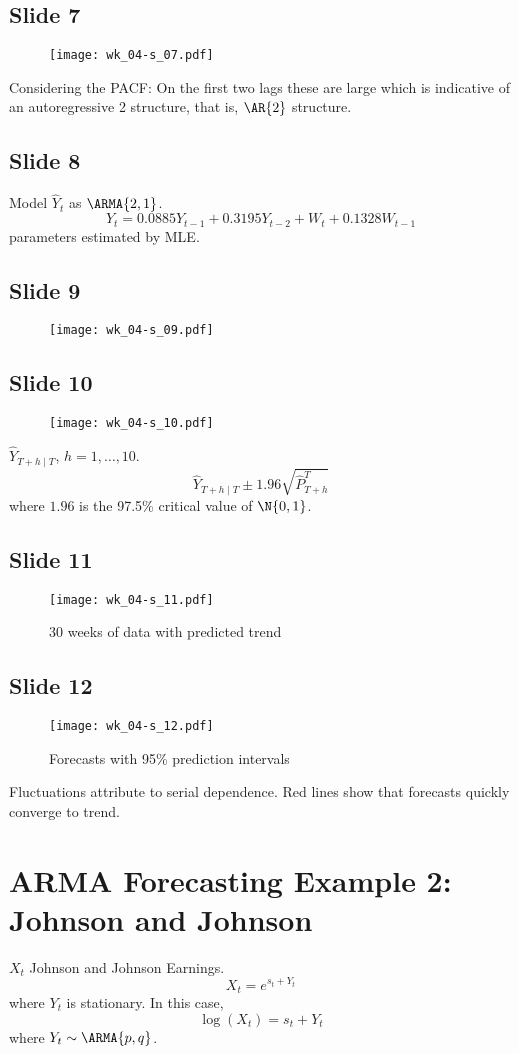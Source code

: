 \subsection*{Slide 7}
\begin{figure}[H]
    \centering
    \texttt{[image: wk\_04-s\_07.pdf]}
\end{figure}
Considering the PACF\@: On the first two lags these are large which
is indicative of an autoregressive 2 structure, that is, $ \AR{2} $
structure.

\subsection*{Slide 8}
Model $ \hat{Y}_{t} $ as $ \ARMA{2,1} $.
\[ Y_t=0.0885 Y_{t-1}+0.3195 Y_{t-2}+W_t +0.1328 W_{t-1} \]
parameters estimated by MLE\@.

\subsection*{Slide 9}
\begin{figure}[H]
    \centering
    \texttt{[image: wk\_04-s\_09.pdf]}
\end{figure}

\subsection*{Slide 10}
\begin{figure}[H]
    \centering
    \texttt{[image: wk\_04-s\_10.pdf]}
\end{figure}
$ \hat{Y}_{T+h\mid T} $, $ h=1,\ldots,10 $.
\[ \hat{Y}_{T+h\mid T}\pm 1.96\sqrt{\hat{P}_{T+h}^T} \]
where $ 1.96 $ is the 97.5\% critical value of $ \N{0,1} $.

\subsection*{Slide 11}
\begin{figure}[H]
    \centering
    \texttt{[image: wk\_04-s\_11.pdf]}
    \caption{30 weeks of data with predicted trend}
\end{figure}

\subsection*{Slide 12}
\begin{figure}[H]
    \centering
    \texttt{[image: wk\_04-s\_12.pdf]}
    \caption{Forecasts with 95\% prediction intervals}
\end{figure}
Fluctuations attribute to serial dependence. Red lines
show that forecasts quickly converge to trend.


\section{ARMA Forecasting Example 2: Johnson and Johnson}
$ X_t $ Johnson and Johnson Earnings.
\[ X_t=e^{s_t+Y_t} \]
where $ Y_t $ is stationary. In this case,
\[ \log(X_t)=s_t+Y_t \]
where $ Y_t \sim \ARMA{p,q} $.
